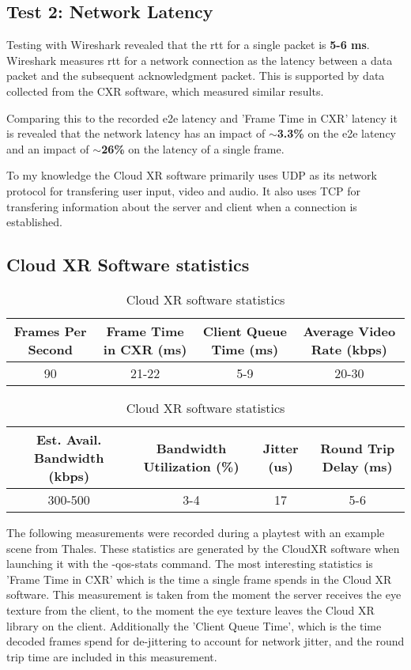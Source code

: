 \subsection{Test 2: Network Latency}
\label{sec:res:t2}
Testing with Wireshark \parencite{wireshark} revealed that the \acrfull{rtt} for a single packet is \textbf{5-6 ms}. Wireshark measures \acrshort{rtt} for a network connection as the latency between a data packet and the subsequent acknowledgment packet. This is supported by data collected from the CXR \parencite{cloudxr} software, which measured similar results. 

Comparing this to the recorded \acrshort{e2e} latency and 'Frame Time in CXR' latency it is revealed that the network latency has an impact of \textbf{$\sim$3.3\%} on the \acrshort{e2e} latency and an impact of \textbf{$\sim$26\%} on the latency of a single frame.

To my knowledge the Cloud XR software primarily uses UDP as its network protocol for transfering user input, video and audio. It also uses TCP for transfering information about the server and client when a connection is established.

\subsection{Cloud XR Software statistics}
\label{sec:res:t3}
\begin{table}[h!]
\begin{center}
\caption{Cloud XR software statistics}
\begin{tabular}{|c|c|c|c|}
\hline
Frames Per Second & Frame Time in CXR (\acrshort{ms}) & Client Queue Time (\acrshort{ms}) & Average Video Rate (kbps)  \\ \hline
90 & 21-22 & 5-9 & 20-30 \\ \hline
\end{tabular}
\begin{tabular}{|c|c|c|c|}
\hline
Est. Avail. Bandwidth (kbps) & Bandwidth Utilization (\%) & Jitter (\acrshort{us}) & Round Trip Delay (\acrshort{ms}) \\ \hline
300-500 & 3-4 & 17 & 5-6 \\ \hline
\end{tabular}
\end{center}
\end{table}

The following measurements were recorded during a playtest with an example scene from Thales. These statistics are generated by the CloudXR software when launching it with the -qos-stats command. The most interesting statistics is 'Frame Time in CXR' which is the time a single frame spends in the Cloud XR software. This measurement is taken from the moment the server receives the eye texture from the client, to the moment the eye texture leaves the Cloud XR library on the client. Additionally the 'Client Queue Time', which is the time decoded frames spend for de-jittering to account for network  jitter, and the round trip time are included in this measurement.